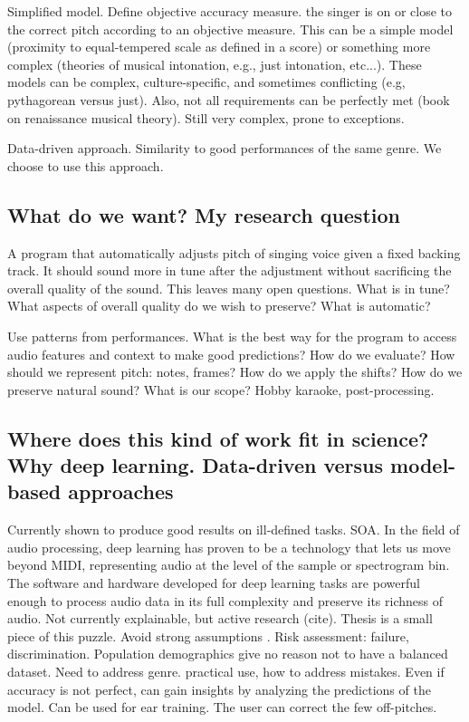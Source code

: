 Simplified model. Define objective accuracy measure. the singer is on or close to the correct pitch according to an objective measure. This can be a simple model (proximity to equal-tempered scale as defined in a score) or something more complex (theories of musical intonation, e.g., just intonation, etc...). These models can be complex, culture-specific, and sometimes conflicting (e.g, pythagorean versus just). Also, not all requirements can be perfectly met (book on renaissance musical theory). Still very complex, prone to exceptions. 

Data-driven approach. Similarity to good performances of the same genre. We choose to use this approach. 

\subsection{What do we want? My research question} A program that automatically adjusts pitch of singing voice given a fixed backing track. It should sound more in tune after the adjustment without sacrificing the overall quality of the sound. This leaves many open questions. What is in tune? What aspects of overall quality do we wish to preserve? What is automatic?

Use patterns from performances. What is the best way for the program to access audio features and context to make good predictions? How do we evaluate? How should we represent pitch: notes, frames? How do we apply the shifts? How do we preserve natural sound? What is our scope? Hobby karaoke, post-processing.

\subsection{Where does this kind of work fit in science? Why deep learning. Data-driven versus model-based approaches}
Currently shown to produce good results on ill-defined tasks. SOA. 
In the field of audio processing, deep learning has proven to be a technology that lets us move beyond MIDI, representing audio at the level of the sample or spectrogram bin. The software and hardware developed for deep learning tasks are powerful enough to process audio data in its full complexity and preserve its richness of audio.
Not currently explainable, but active research (cite).
Thesis is a small piece of this puzzle.
Avoid strong assumptions \cite{wager2019causal}.
Risk assessment: failure, discrimination.
Population demographics give no reason not to have a balanced dataset. Need to address genre.
practical use, how to address mistakes.
Even if accuracy is not perfect, can gain insights by analyzing the predictions of the model. Can be used for ear training. The user can correct the few off-pitches.

